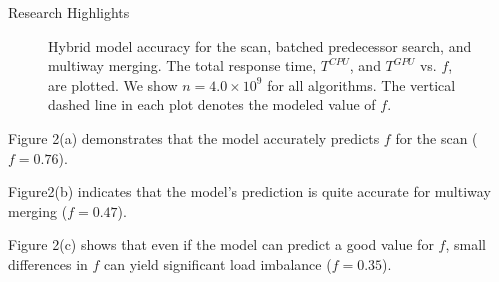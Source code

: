 \documentclass[final]{beamer}
\newlength{\colwidth}
\begin{document}
\begin{frame}[t]
\begin{columns}[t]
\begin{column}{\colwidth}
  \begin{block}{Research Highlights}
\begin{figure}[htp]
\centering
{}

 \caption{Hybrid model accuracy for the scan, batched predecessor search, and multiway merging. The total response time, $T^{CPU}$, and $T^{GPU}$ vs. $f$, are plotted. We show $n=4.0\times10^9$ for all algorithms. The vertical dashed line in each plot denotes the modeled value of $f$.}

 \label{fig:time_vs_f}
\end{figure}

\begin{description}[font=$\bullet$~\normalfont\scshape\color{red!50!black}]
\item Figure 2(a) demonstrates that the model accurately predicts $f$ for the scan ($f=0.76$).
\item  Figure2(b) indicates that the model's prediction is quite accurate for multiway merging ($f=0.47$).
\item  Figure 2(c) shows that even if the model can predict a good value for $f$, small differences in $f$ can yield significant load imbalance ($f=0.35$). 
\end{description}


\end{block}
\end{column}
\end{columns}
\end{frame}
\end{document}
